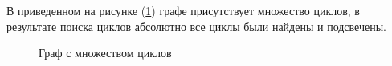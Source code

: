 В приведенном на рисунке (\ref{fig:example_many_cycles}) графе присутствует множество циклов, в результате поиска циклов абсолютно все циклы были найдены и подсвечены.

\begin{figure}[ht!]
\caption{Граф с множеством циклов}
\label{fig:example_many_cycles}
\end{figure}